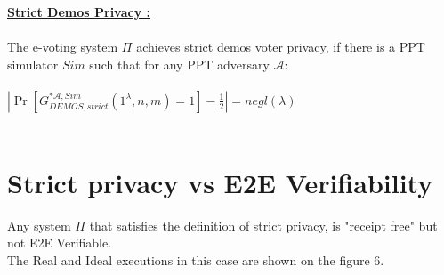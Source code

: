 \documentclass[12pt]{article}
\begin{document}
\underline{\textbf{Strict Demos Privacy :}}\\\\
The e-voting system $\Pi$ achieves strict demos voter privacy, if there is a PPT simulator $Sim$ such that for any PPT adversary $\mathcal{A}$:\\\\
 $|\Pr[G_{DEMOS,strict}^{*\mathcal{A},Sim}(1^{\lambda},n,m) = 1] - \frac{1}{2}| = negl(\lambda)$\\\\
%
\section{Strict privacy vs E2E Verifiability}
Any system $\Pi$ that satisfies the definition of strict privacy, is "receipt free" but not E2E Verifiable.\\
The Real and Ideal executions in this case are shown on the figure 6.
\end{document}
